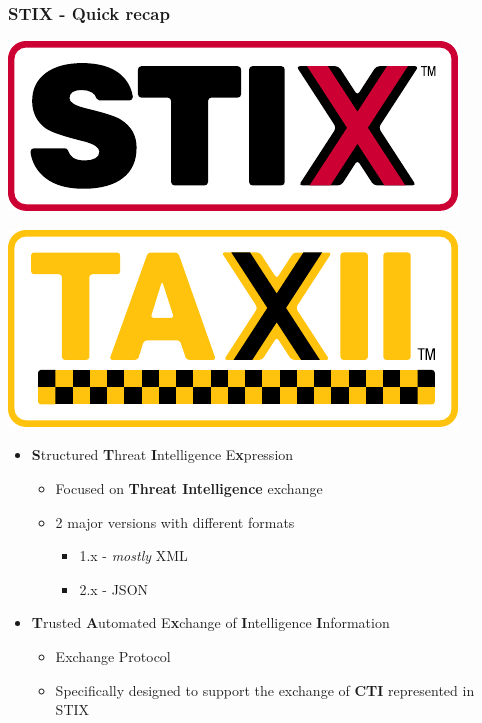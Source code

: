 \begin{frame}
    \frametitle{STIX - Quick recap}
    \begin{minipage}{0.5\textwidth}
        \centering
        \includegraphics[scale=0.5]{images/LOGO_STIX.pdf}
    \end{minipage}%
    \begin{minipage}{0.5\textwidth}
        \centering
        \includegraphics[scale=0.45]{images/LOGO_TAXII.pdf}
    \end{minipage}
    \vspace{1em}
    \begin{itemize}
        \item \textbf{S}tructured \textbf{T}hreat \textbf{I}ntelligence E\textbf{x}pression
        \begin{itemize}
            \item Focused on \textbf{Threat Intelligence} exchange
            \item 2 major versions with different formats
            \begin{itemize}
                \item 1.x - \emph{mostly} XML
                \item 2.x - JSON
            \end{itemize}
        \end{itemize}
        \item \textbf{T}rusted \textbf{A}utomated E\textbf{x}change of \textbf{I}ntelligence \textbf{I}nformation
        \begin{itemize}
            \item Exchange Protocol
            \item Specifically designed to support the exchange of \textbf{CTI} represented in STIX
        \end{itemize}
    \end{itemize}
\end{frame}

